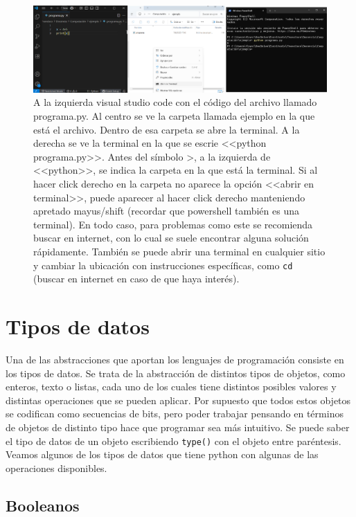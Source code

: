 \documentclass[a4paper, 12pt]{report}
\theoremstyle{definition}
\begin{document}
\begin{figure}
	\centering
	\includegraphics[scale=0.4]{ejecPython.png}
	\caption{A la izquierda visual studio code con el código del archivo llamado programa.py. Al centro se ve la carpeta llamada ejemplo en la que está el archivo. Dentro de esa carpeta se abre la terminal. A la derecha se ve la terminal en la que se escrie <<python programa.py>>. Antes del símbolo >, a la izquierda de <<python>>, se indica la carpeta en la que está la terminal. Si al hacer click derecho en la carpeta no aparece la opción <<abrir en terminal>>, puede aparecer al hacer click derecho manteniendo apretado mayus/shift (recordar que powershell también es una terminal). En todo caso, para problemas como este se recomienda buscar en internet, con lo cual se suele encontrar alguna solución rápidamente. También se puede abrir una terminal en cualquier sitio y cambiar la ubicación con instrucciones específicas, como {\tt cd} (buscar en internet en caso de que haya interés).}
	\label{fig-ejecPython}
\end{figure}
\section{Tipos de datos}

Una de las abstracciones que aportan los lenguajes de programación consiste en los tipos de datos. Se trata de la abstracción de distintos tipos de objetos, como enteros, texto o listas, cada uno de los cuales tiene distintos posibles valores y distintas operaciones que se pueden aplicar. Por supuesto que todos estos objetos se codifican como secuencias de bits, pero poder trabajar pensando en términos de objetos de distinto tipo hace que programar sea más intuitivo. Se puede saber el tipo de datos de un objeto escribiendo {\tt type()} con el objeto entre paréntesis. Veamos algunos de los tipos de datos que tiene python con algunas de las operaciones disponibles. 

\subsection{Booleanos}
\end{document}
